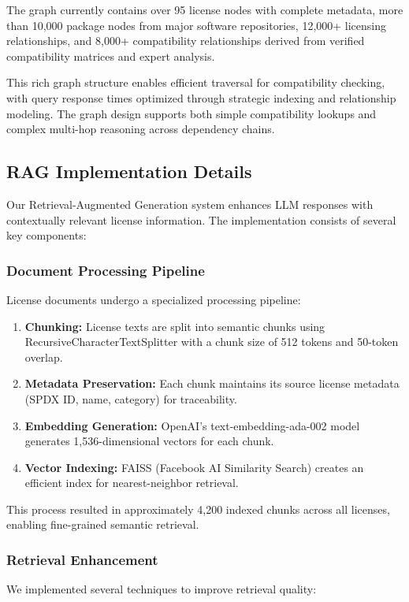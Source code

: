 \documentclass[9pt,twocolumn]{article}
\begin{document}
The graph currently contains over 95 license nodes with complete metadata, more than 10,000 package nodes from major software repositories, 12,000+ licensing relationships, and 8,000+ compatibility relationships derived from verified compatibility matrices and expert analysis.

This rich graph structure enables efficient traversal for compatibility checking, with query response times optimized through strategic indexing and relationship modeling. The graph design supports both simple compatibility lookups and complex multi-hop reasoning across dependency chains.

\subsection{RAG Implementation Details}
\label{sec:rag_implementation}

Our Retrieval-Augmented Generation system enhances LLM responses with contextually relevant license information. The implementation consists of several key components:

\subsubsection{Document Processing Pipeline}
License documents undergo a specialized processing pipeline:

\begin{enumerate}
    \item \textbf{Chunking:} License texts are split into semantic chunks using RecursiveCharacterTextSplitter with a chunk size of 512 tokens and 50-token overlap.
    \item \textbf{Metadata Preservation:} Each chunk maintains its source license metadata (SPDX ID, name, category) for traceability.
    \item \textbf{Embedding Generation:} OpenAI's text-embedding-ada-002 model generates 1,536-dimensional vectors for each chunk.
    \item \textbf{Vector Indexing:} FAISS (Facebook AI Similarity Search) creates an efficient index for nearest-neighbor retrieval.
\end{enumerate}

This process resulted in approximately 4,200 indexed chunks across all licenses, enabling fine-grained semantic retrieval.

\subsubsection{Retrieval Enhancement}
We implemented several techniques to improve retrieval quality:
\end{document}
